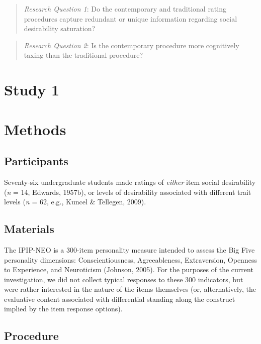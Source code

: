 \documentclass[
  ,jou]{apa6}
\begin{document}
\begin{quote}
\emph{Research Question 1}: Do the contemporary and traditional rating procedures capture redundant or unique information regarding social desirability saturation?
\end{quote}

\begin{quote}
\emph{Research Question 2}: Is the contemporary procedure more cognitively taxing than the traditional procedure?
\end{quote}

\hypertarget{study-1}{%
\section{Study 1}\label{study-1}}

\hypertarget{methods}{%
\section{Methods}\label{methods}}

\hypertarget{participants}{%
\subsection{Participants}\label{participants}}

Seventy-six undergraduate students made ratings of \emph{either} item social desirability (\emph{n} = 14, Edwards, 1957b), or levels of desirability associated with different trait levels (\emph{n} = 62, e.g., Kuncel \& Tellegen, 2009).

\hypertarget{materials}{%
\subsection{Materials}\label{materials}}

The IPIP-NEO is a 300-item personality measure intended to assess the Big Five personality dimensions: Conscientiousness, Agreeableness, Extraversion, Openness to Experience, and Neuroticism (Johnson, 2005). For the purposes of the current investigation, we did not collect typical responses to these 300 indicators, but were rather interested in the nature of the items themselves (or, alternatively, the evaluative content associated with differential standing along the construct implied by the item response options).

\hypertarget{procedure}{%
\subsection{Procedure}\label{procedure}}
\end{document}
